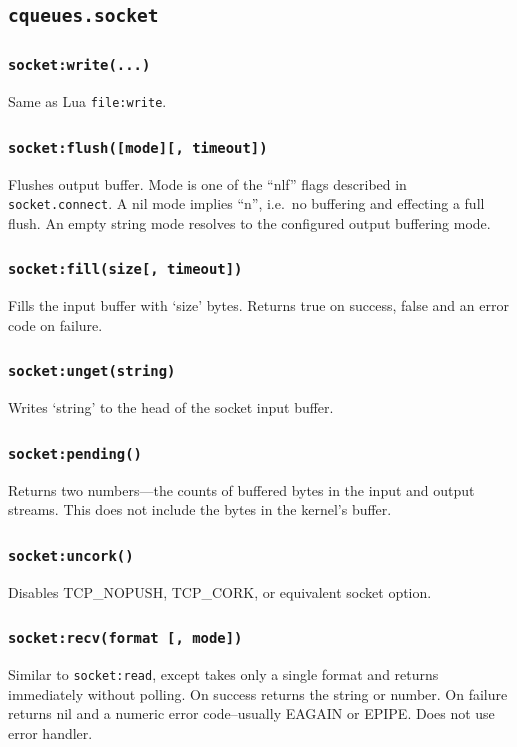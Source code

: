 \documentclass[11pt, oneside]{memoir}
\newcommand*{\fn}[1]{\texttt{#1}\xspace}
\newcommand*{\method}[1]{\texttt{#1}\xspace}
\newcounter{toccols}
\newenvironment{Module}[1]{
	\subsection{\texttt{#1}}
	\addtocontents{toc}{
		\protect\begin{multicols}{\value{toccols}}
	}
}{
	\addtocontents{toc}{\protect\end{multicols}}
}
\begin{document}
\begin{Module}{cqueues.socket}
\subsubsection[\fn{socket:write}]{\fn{socket:write(...)}}
Same as Lua \fn{file:write}.

\subsubsection[\fn{socket:flush}]{\fn{socket:flush([mode][, timeout])}}
Flushes output buffer. Mode is one of the ``nlf'' flags described in \method{socket.connect}. A nil mode implies ``n'', i.e.\ no buffering and effecting a full flush. An empty string mode resolves to the configured output buffering mode.

\subsubsection[\fn{socket:fill}]{\fn{socket:fill(size[, timeout])}}
Fills the input buffer with `size' bytes. Returns true on success, false and an error code on failure.

\subsubsection[{\fn{socket:unget}}]{\fn{socket:unget(string)}}
Writes `string' to the head of the socket input buffer.

\subsubsection[{\fn{socket:pending}}]{\fn{socket:pending()}}
Returns two numbers---the counts of buffered bytes in the input and output streams. This does not include the bytes in the kernel's buffer.

\subsubsection[\fn{socket:uncork}]{\fn{socket:uncork()}}
Disables TCP\_NOPUSH, TCP\_CORK, or equivalent socket option.

\subsubsection[\fn{socket:recv}]{\fn{socket:recv(format [, mode])}}
Similar to \method{socket:read}, except takes only a single format and returns immediately without polling. On success returns the string or number. On failure returns nil and a numeric error code--usually EAGAIN or EPIPE. Does not use error handler.


\end{Module}
\end{document}
